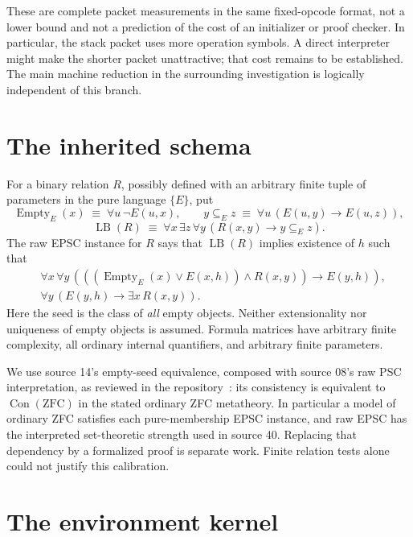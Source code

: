 \documentclass[11pt]{article}
\newcommand{\Con}{\operatorname{Con}}
\newcommand{\Empty}{\operatorname{Empty}}
\newcommand{\LB}{\operatorname{LB}}
\begin{document}
These are complete packet measurements in the same fixed-opcode format, not a lower bound and not a prediction of the cost of an initializer or proof checker. In particular, the stack packet uses more operation symbols. A direct interpreter might make the shorter packet unattractive; that cost remains to be established. The main machine reduction in the surrounding investigation is logically independent of this branch.

\section{The inherited schema}

For a binary relation $R$, possibly defined with an arbitrary finite tuple of parameters in the pure language $\{E\}$, put
\[
 \Empty_E(x)\;\equiv\;\forall u\,\neg E(u,x),\qquad
 y\subseteq_E z\;\equiv\;\forall u\,(E(u,y)\to E(u,z)),
\]
\[
 \LB(R)\;\equiv\;\forall x\,\exists z\,\forall y\,
                    (R(x,y)\to y\subseteq_E z).
\]
The raw EPSC instance for $R$ says that $\LB(R)$ implies existence of $h$ such that
\begin{align}
 &\forall x\,\forall y\,
  (((\Empty_E(x)\lor E(x,h))\land R(x,y))\to E(y,h)),\label{eq:closure}\\
 &\forall y\,(E(y,h)\to\exists x\,R(x,y)).\label{eq:support}
\end{align}
Here the seed is the class of \emph{all} empty objects. Neither extensionality nor uniqueness of empty objects is assumed. Formula matrices have arbitrary finite complexity, all ordinary internal quantifiers, and arbitrary finite parameters.

We use source 14's empty-seed equivalence, composed with source 08's raw PSC interpretation, as reviewed in the repository~\cite{repo14}: its consistency is equivalent to $\Con(\mathrm{ZFC})$ in the stated ordinary ZFC metatheory. In particular a model of ordinary ZFC satisfies each pure-membership EPSC instance, and raw EPSC has the interpreted set-theoretic strength used in source 40. Replacing that dependency by a formalized proof is separate work. Finite relation tests alone could not justify this calibration.

\section{The environment kernel}
\end{document}
